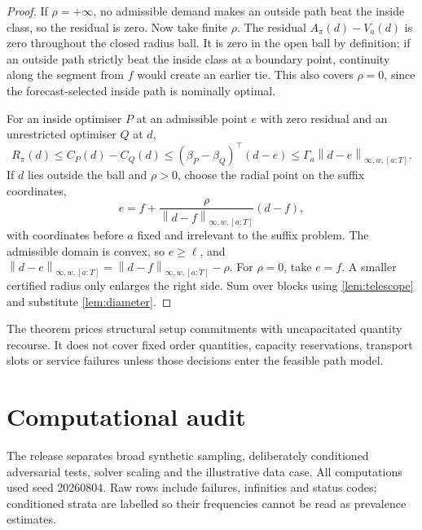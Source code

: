 \documentclass[11pt]{article}
\theoremstyle{definition}
\newcommand{\norm}[1]{\left\lVert #1\right\rVert}
\newcommand{\ellv}{\ell}
\begin{document}
\begin{proof}
If $\rho=+\infty$, no admissible demand makes an outside path beat the inside class, so the residual is zero. Now take finite $\rho$. The residual $A_\pi(d)-V_a(d)$ is zero throughout the closed radius ball. It is zero in the open ball by definition; if an outside path strictly beat the inside class at a boundary point, continuity along the segment from $f$ would create an earlier tie. This also covers $\rho=0$, since the forecast-selected inside path is nominally optimal.

For an inside optimiser $P$ at an admissible point $e$ with zero residual and an unrestricted optimiser $Q$ at $d$,
\[
R_\pi(d)
\le C_P(d)-C_Q(d)
\le(\beta_P-\beta_Q)^\top(d-e)
\le\Gamma_a\norm{d-e}_{\infty,w,[a:T]}.
\]
If $d$ lies outside the ball and $\rho>0$, choose the radial point on the suffix coordinates,
\[
e=f+\frac{\rho}{\norm{d-f}_{\infty,w,[a:T]}}(d-f),
\]
with coordinates before $a$ fixed and irrelevant to the suffix problem. The admissible domain is convex, so $e\ge\ellv$, and
$\norm{d-e}_{\infty,w,[a:T]}=\norm{d-f}_{\infty,w,[a:T]}-\rho$.
For $\rho=0$, take $e=f$. A smaller certified radius only enlarges the right side. Sum over blocks using \cref{lem:telescope} and substitute \cref{lem:diameter}.
\end{proof}

The theorem prices structural setup commitments with uncapacitated quantity recourse. It does not cover fixed order quantities, capacity reservations, transport slots or service failures unless those decisions enter the feasible path model.

\section{Computational audit}\label{sec:audit}

The release separates broad synthetic sampling, deliberately conditioned adversarial tests, solver scaling and the illustrative data case. All computations used seed 20260804. Raw rows include failures, infinities and status codes; conditioned strata are labelled so their frequencies cannot be read as prevalence estimates.
\end{document}
